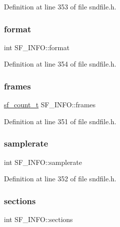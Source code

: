 Definition at line 353 of file sndfile.\+h.

\mbox{\label{struct_s_f___i_n_f_o_a36a7c3ae9a8229797f19267b4ba07361}} 
\subsubsection{\texorpdfstring{format}{format}}
{\footnotesize\ttfamily int S\+F\+\_\+\+I\+N\+F\+O\+::format}



Definition at line 354 of file sndfile.\+h.

\mbox{\label{struct_s_f___i_n_f_o_a80838e7063ecc3d8d7ff9f92ab1efdfb}} 
\subsubsection{\texorpdfstring{frames}{frames}}
{\footnotesize\ttfamily \mbox{\hyperlink{sndfile_8h_af2b12fded74bc949f1f1f392a2af4892}{sf\+\_\+count\+\_\+t}} S\+F\+\_\+\+I\+N\+F\+O\+::frames}



Definition at line 351 of file sndfile.\+h.

\mbox{\label{struct_s_f___i_n_f_o_acfd248e20ab1c58b57aafc7b16404a5f}} 
\subsubsection{\texorpdfstring{samplerate}{samplerate}}
{\footnotesize\ttfamily int S\+F\+\_\+\+I\+N\+F\+O\+::samplerate}



Definition at line 352 of file sndfile.\+h.

\mbox{\label{struct_s_f___i_n_f_o_a5f4c7cb564c05f6c3eeac9164a806544}} 
\subsubsection{\texorpdfstring{sections}{sections}}
{\footnotesize\ttfamily int S\+F\+\_\+\+I\+N\+F\+O\+::sections}



